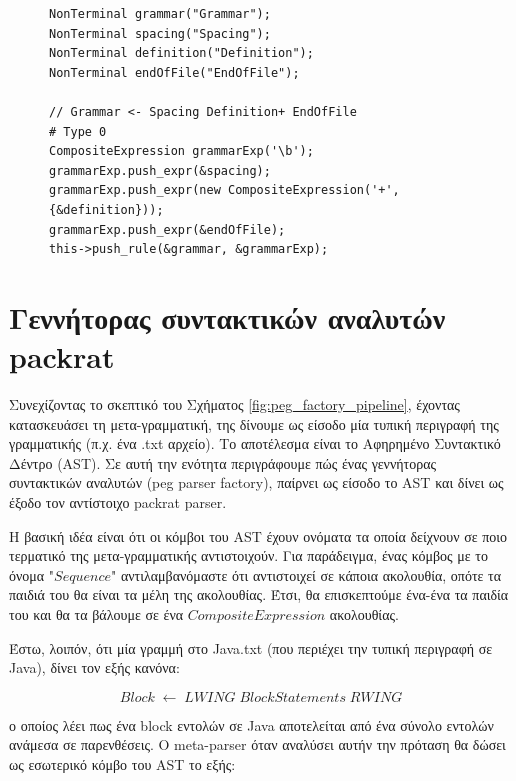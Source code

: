 \documentclass[diploma]{softlab-thesis}
\begin{document}
\begin{figure}[h]
\setlength\partopsep{-\topsep}%
\begin{verbatim}
NonTerminal grammar("Grammar");
NonTerminal spacing("Spacing");
NonTerminal definition("Definition");
NonTerminal endOfFile("EndOfFile");

// Grammar <- Spacing Definition+ EndOfFile                     # Type 0
CompositeExpression grammarExp('\b');
grammarExp.push_expr(&spacing);
grammarExp.push_expr(new CompositeExpression('+', {&definition}));
grammarExp.push_expr(&endOfFile);
this->push_rule(&grammar, &grammarExp);
\end{verbatim}
\caption{%
  \label{fig:meta_example}}
\end{figure}

\section{Γεννήτορας συντακτικών αναλυτών packrat}

Συνεχίζοντας το σκεπτικό του Σχήματος \ref{fig:peg_factory_pipeline}, έχοντας κατασκευάσει τη μετα-γραμματική, της δίνουμε ως είσοδο μία τυπική περιγραφή της γραμματικής (π.χ. ένα .txt αρχείο). 
Το αποτέλεσμα είναι το Αφηρημένο Συντακτικό Δέντρο (AST). 
Σε αυτή την ενότητα περιγράφουμε πώς ένας γεννήτορας συντακτικών αναλυτών (peg parser factory), παίρνει ως είσοδο το AST και δίνει ως έξοδο τον αντίστοιχο packrat parser.

Η βασική ιδέα είναι ότι οι κόμβοι του AST έχουν ονόματα τα οποία δείχνουν σε ποιο τερματικό της μετα-γραμματικής αντιστοιχούν.
Για παράδειγμα, ένας κόμβος με το όνομα "$Sequence$" αντιλαμβανόμαστε ότι αντιστοιχεί σε κάποια ακολουθία, οπότε τα παιδιά του θα είναι τα μέλη της ακολουθίας.
Έτσι, θα επισκεπτούμε ένα-ένα τα παιδία του και θα τα βάλουμε σε ένα $CompositeExpression$ ακολουθίας.

Έστω, λοιπόν, ότι μία γραμμή στο Java.txt (που περιέχει την τυπική περιγραφή σε Java), δίνει τον εξής κανόνα:

\begin{equation}
	Block \; \leftarrow \; LWING \; BlockStatements \; RWING
\end{equation}

ο οποίος λέει πως ένα block εντολών σε Java αποτελείται από ένα σύνολο εντολών ανάμεσα σε παρενθέσεις.
Ο meta-parser όταν αναλύσει αυτήν την πρόταση θα δώσει ως εσωτερικό κόμβο του AST το εξής:
\end{document}
